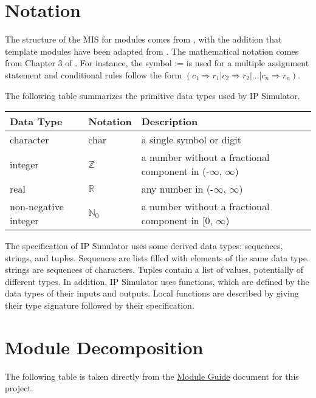 \documentclass[12pt, titlepage]{article}
\begin{document}
\section{Notation}

The structure of the MIS for modules comes from \citet{HoffmanAndStrooper1995},
with the addition that template modules have been adapted from
\cite{GhezziEtAl2003}.  The mathematical notation comes from Chapter 3 of
\citet{HoffmanAndStrooper1995}.  For instance, the symbol := is used for a
multiple assignment statement and conditional rules follow the form $(c_1
\Rightarrow r_1 | c_2 \Rightarrow r_2 | ... | c_n \Rightarrow r_n )$.

The following table summarizes the primitive data types used by IP Simulator. 

\begin{center}
\renewcommand{\arraystretch}{1.2}
\noindent 
\begin{tabular}{l l p{7.5cm}} 
\toprule 
\textbf{Data Type} & \textbf{Notation} & \textbf{Description}\\ 
\midrule
character & char & a single symbol or digit\\
integer & $\mathbb{Z}$ & a number without a fractional component in (-$\infty$, $\infty$) \\
real & $\mathbb{R}$ & any number in (-$\infty$, $\infty$)\\
non-negative integer& $\mathbb{N}_0$ &a number without a fractional component in [0, $\infty$)\\
\bottomrule
\end{tabular} 
\end{center}

\noindent
The specification of IP Simulator uses some derived data types: sequences, strings, and tuples. Sequences are lists filled with elements of the same data type. strings
are sequences of characters. Tuples contain a list of values, potentially of different types. In addition, IP Simulator uses functions, which are defined by the data types of their inputs and outputs. Local functions are described by giving their type signature followed by their specification.

\section{Module Decomposition}

The following table is taken directly from the \href{https://github.com/MinMah23/CAS741-Project/blob/main/docs/Design/SoftArchitecture/MG.pdf}{Module Guide} document for this project.
\end{document}
